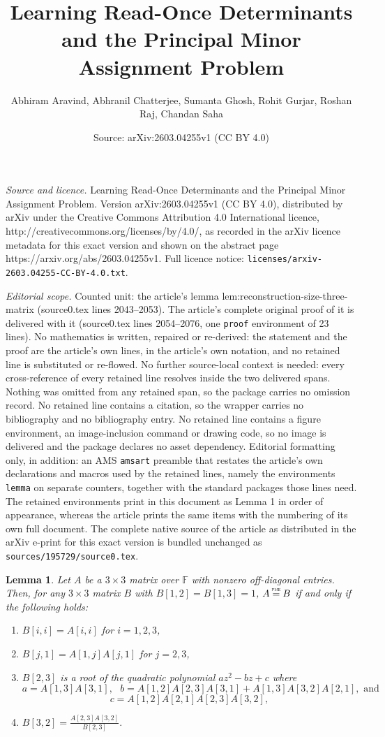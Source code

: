 \documentclass[10pt,a4paper]{amsart}
\title{Learning Read-Once Determinants and the Principal Minor Assignment Problem}
\author{Abhiram Aravind, Abhranil Chatterjee, Sumanta Ghosh, Rohit Gurjar, Roshan Raj, Chandan Saha}
\date{Source: arXiv:2603.04255v1 (CC BY 4.0)}
\newtheorem{lemma}{Lemma}
\newcommand{\F}{\mathbb{F}}
\newcommand{\PME}{\stackrel{\mathclap{\scalebox{.4}{\mbox{PME}}}}{=}}
\begin{document}
\maketitle

\noindent\emph{Source and licence.} Learning Read-Once Determinants and the Principal Minor Assignment Problem. Version arXiv:2603.04255v1 (CC BY 4.0), distributed by arXiv under the Creative Commons Attribution 4.0 International licence, http://creativecommons.org/licenses/by/4.0/, as recorded in the arXiv licence metadata for this exact version and shown on the abstract page https://arxiv.org/abs/2603.04255v1. Full licence notice: \texttt{licenses/arxiv-2603.04255-CC-BY-4.0.txt}.\par\smallskip

\noindent\textit{Editorial scope.} Counted unit: the article's lemma lem:reconstruction-size-three-matrix (source0.tex lines 2043--2053). The article's complete original proof of it is delivered with it (source0.tex lines 2054--2076, one \texttt{proof} environment of 23 lines). No mathematics is written, repaired or re-derived: the statement and the proof are the article's own lines, in the article's own notation, and no retained line is substituted or re-flowed.  No further source-local context is needed: every cross-reference of every retained line resolves inside the two delivered spans.  Nothing was omitted from any retained span, so the package carries no omission record.  No retained line contains a citation, so the wrapper carries no bibliography and no bibliography entry.  No retained line contains a figure environment, an image-inclusion command or drawing code, so no image is delivered and the package declares no asset dependency.  Editorial formatting only, in addition: an AMS \texttt{amsart} preamble that restates the article's own declarations and macros used by the retained lines, namely the environments \texttt{lemma} on separate counters, together with the standard packages those lines need.  The retained environments print in this document as Lemma 1 in order of appearance, whereas the article prints the same items with the numbering of its own full document.  The complete native source of the article as distributed in the arXiv e-print for this exact version is bundled unchanged as \texttt{sources/195729/source0.tex}.
\begin{lemma}
\label{lem:reconstruction-size-three-matrix}
Let $A$ be a $3\times 3$ matrix over $\F$ with nonzero off-diagonal entries. Then, for any $3\times 3$ matrix $B$ with $B[1,2]=B[1,3]=1$, $A\PME B$ if and only if the following holds: 
\begin{enumerate}
\item $B[i,i]=A[i,i]$ for $i=1,2,3$, 
\item $B[j, 1]=A[1,j]A[j,1]$ for $j=2,3$, 
\item $B[2,3]$ is a root of the quadratic polynomial $az^2-bz+c$ where
 $$a=A[1,3]A[3,1],\ \ \ b=A[1,2]A[2,3]A[3,1]+A[1,3]A[3,2]A[2,1], \text{ and }$$  $$c=A[1,2]A[2,1]A[2,3]A[3,2],$$ 
\item $B[3,2]=\frac{A[2,3]A[3,2]}{B[2,3]}.$
\end{enumerate}
\end{lemma}
\end{document}

